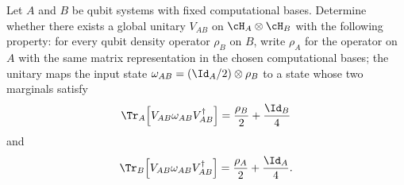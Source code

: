 Let $A$ and $B$ be qubit systems with fixed computational bases. Determine whether there exists a global unitary $V_{AB}$ on $\cH_A\otimes\cH_B$ with the following property: for every qubit density operator $\rho_B$ on $B$, write $\rho_A$ for the operator on $A$ with the same matrix representation in the chosen computational bases; the unitary maps the input state $\omega_{AB}=(\Id_A/2)\otimes\rho_B$ to a state whose two marginals satisfy
$$
\Tr_A\!\left[V_{AB}\omega_{AB}V_{AB}^\dagger\right]
=
\frac{\rho_B}{2}+\frac{\Id_B}{4}
$$
and
$$
\Tr_B\!\left[V_{AB}\omega_{AB}V_{AB}^\dagger\right]
=
\frac{\rho_A}{2}+\frac{\Id_A}{4}.
$$
